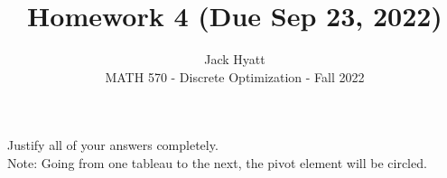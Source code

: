 \documentclass[12pt]{article}
\begin{document}
 
 
 
\title{Homework 4 (Due Sep 23, 2022)}
\author{Jack Hyatt\\ %
MATH 570 - Discrete Optimization - Fall 2022} %

\maketitle

Justify all of your answers completely.\\

Note: Going from one tableau to the next, the pivot element will be circled.
\end{document}
